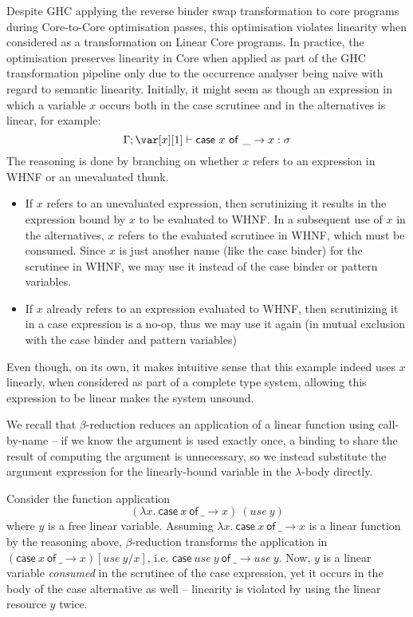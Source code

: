 \documentclass[acmsmall, screen, review]{acmart}
\newcommand{\ccase}[2]{\mathsf{case}~#1~\mathsf{of}~#2}
\begin{document}
Despite GHC applying the reverse binder swap transformation to core programs
during Core-to-Core optimisation passes, this optimisation violates linearity
when considered as a transformation on Linear Core programs. In practice, the
optimisation preserves linearity in Core when applied as part of the GHC
transformation pipeline only due to the occurrence analyser being naive with
regard to semantic linearity. Initially, it might seem as though an expression
in which a variable $x$ occurs both in the case scrutinee and in the
alternatives is linear, for example:
\[
\G; \xl \vdash \ccase{x}{\_ \to x} : \s
\]
The reasoning is done by branching on whether $x$ refers to an expression in
WHNF or an unevaluated thunk.
\begin{itemize}
\item If $x$ refers to an unevaluated expression, then scrutinizing it results
in the expression bound by $x$ to be evaluated to WHNF. In a subsequent use of
$x$ in the alternatives, $x$ refers to the evaluated scrutinee in WHNF, which
must be consumed. Since $x$ is just another name (like the case binder) for the
scrutinee in WHNF, we may use it instead of the case binder or pattern
variables.
\item If $x$ already refers to an expression evaluated to WHNF, then
scrutinizing it in a case expression is a no-op, thus we may use it again (in
mutual exclusion with the case binder and pattern variables)
\end{itemize}
%
%
Even though, on its own, it makes intuitive sense that this example indeed uses
$x$ linearly, when considered as part of a complete type system, allowing this
expression to be linear makes the system unsound.

We recall that $\beta$-reduction reduces an application of a linear function
using call-by-name -- if we know the argument is used exactly once, a binding
to share the result of computing the argument is unnecessary, so we instead
substitute the argument expression for the linearly-bound variable in the
$\lambda$-body directly.

Consider the function application $$(\lambda x.~\ccase{x}{\_ \to x})~(use~y)$$
where $y$ is a free linear variable. Assuming $\lambda x.~\ccase{x}{\_ \to x}$
is a linear function by the reasoning above, $\beta$-reduction transforms the
application in $(\ccase{x}{\_ \to x})[use~y/x]$, i.e. $\ccase{use~y}{\_ \to
use~y}$. Now, $y$ is a linear variable \emph{consumed} in the scrutinee of the case
expression, yet it occurs in the body of the case alternative as well --
linearity is violated by using the linear resource $y$ twice.
\end{document}
